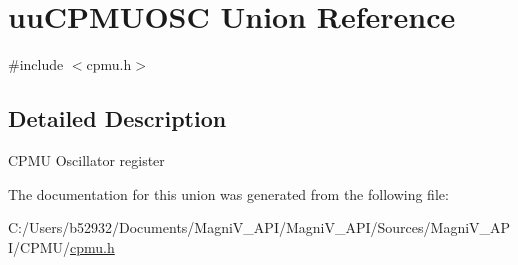 \hypertarget{unionuu_c_p_m_u_o_s_c}{}\section{uu\+C\+P\+M\+U\+O\+S\+C Union Reference}
\label{unionuu_c_p_m_u_o_s_c}


{\ttfamily \#include $<$cpmu.\+h$>$}



\subsection{Detailed Description}

\begin{DoxyItemize}
\item C\+P\+M\+U Oscillator register 
\end{DoxyItemize}

The documentation for this union was generated from the following file\+:\begin{DoxyCompactItemize}
\item 
C\+:/\+Users/b52932/\+Documents/\+Magni\+V\+\_\+\+A\+P\+I/\+Magni\+V\+\_\+\+A\+P\+I/\+Sources/\+Magni\+V\+\_\+\+A\+P\+I/\+C\+P\+M\+U/\hyperlink{cpmu_8h}{cpmu.\+h}\end{DoxyCompactItemize}
